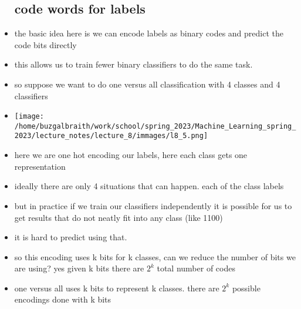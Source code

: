 \documentclass{article}
\begin{document}
\begin{itemize}
\subsection*{code words for labels}
\item the basic idea here is we can encode labels as binary codes  and predict the code bits directly 
\item this allows us to train fewer binary classifiers to do the same task. 
\item so suppose we want to do one versus all classification  with 4 classes and 4 classifiers 
\item  \texttt{[image: /home/buzgalbraith/work/school/spring\_2023/Machine\_Learning\_spring\_2023/lecture\_notes/lecture\_8/immages/l8\_5.png]}
\item here we are one hot encoding our labels, here each class gets one representation 
\item ideally there are only 4 situations that can happen. each of the class labels
\item but in practice if we train our classifiers independently  it is possible for us to get results that do not neatly fit into any class  (like 1100)
\item it is hard to predict using that. 
\item so this encoding uses k bits for k classes, can we reduce the number of bits we are using? yes given k bits there are $2^k$ total number of codes 
\item one versus all uses k bits to represent k classes. there are $2^k$ possible encodings done with k bits

\end{itemize}
\end{document}
